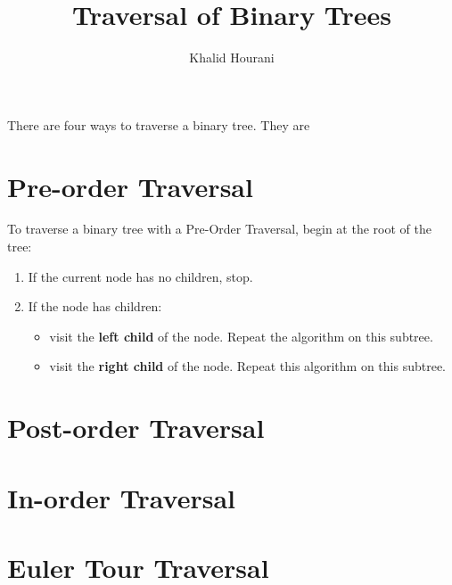 \documentclass[a4paper]{article}
\title{Traversal of Binary Trees}
\author{Khalid Hourani}
\begin{document}
There are four ways to traverse a binary tree. They are


\section{Pre-order Traversal}
To traverse a binary tree with a Pre-Order Traversal, begin at the root of the tree:
\begin{enumerate}
	\item If the current node has no children, stop.
    \item If the node has children:
    \begin{itemize}\item visit the \textbf{left  child} of the node. Repeat the algorithm on this subtree.
    				\item visit the \textbf{right child} of the node. Repeat this algorithm on this subtree.
	\end{itemize}
\end{enumerate}
\section{Post-order Traversal}
\section{In-order Traversal}
\section{Euler Tour Traversal}

\center
{}
\end{document}
